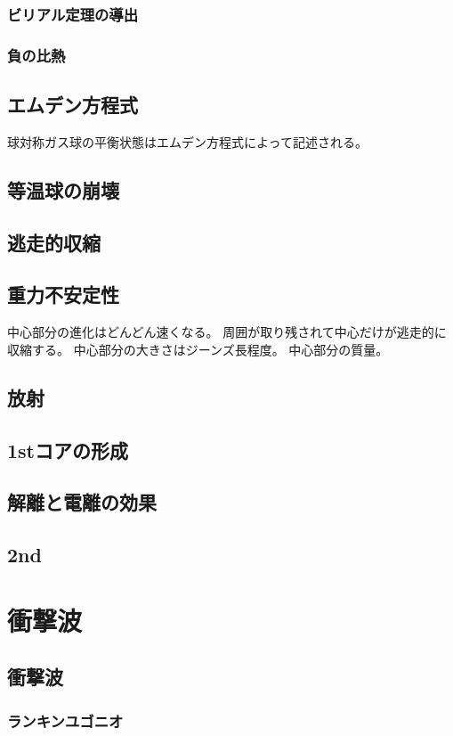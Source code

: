 \documentclass{jsarticle}
\begin{document}
\subsubsection{ビリアル定理の導出}

\subsubsection{負の比熱}
\subsection{エムデン方程式}
球対称ガス球の平衡状態はエムデン方程式によって記述される。
\subsection{等温球の崩壊}
\subsection{逃走的収縮}
\subsection{重力不安定性}
中心部分の進化はどんどん速くなる。
周囲が取り残されて中心だけが逃走的に収縮する。
中心部分の大きさはジーンズ長程度。
中心部分の質量。
\subsection{放射}
\subsection{1stコアの形成}
\subsection{解離と電離の効果}
\subsection{2nd}
\section{衝撃波}
\subsection{衝撃波}
\subsubsection{ランキンユゴニオ}
\end{document}
